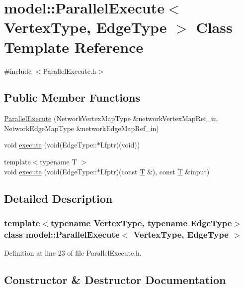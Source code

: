 \hypertarget{classmodel_1_1_parallel_execute}{}\section{model\+:\+:Parallel\+Execute$<$ Vertex\+Type, Edge\+Type $>$ Class Template Reference}
\label{classmodel_1_1_parallel_execute}


{\ttfamily \#include $<$Parallel\+Execute.\+h$>$}

\subsection*{Public Member Functions}
\begin{DoxyCompactItemize}
\item 
\hyperlink{classmodel_1_1_parallel_execute_a59e18e460e727b43d7bd078659be7662}{Parallel\+Execute} (Network\+Vertex\+Map\+Type \&network\+Vertex\+Map\+Ref\+\_\+in, Network\+Edge\+Map\+Type \&network\+Edge\+Map\+Ref\+\_\+in)
\item 
void \hyperlink{classmodel_1_1_parallel_execute_abeb5a58c4db9e037e8de14afe0d99475}{execute} (void(Edge\+Type\+::$\ast$Lfptr)(void))
\item 
{\footnotesize template$<$typename T $>$ }\\void \hyperlink{classmodel_1_1_parallel_execute_a19b90e4dd8cca8bdea9030ba03e07f00}{execute} (void(Edge\+Type\+::$\ast$Lfptr)(const \hyperlink{_spline_node_base__corder1_8h_a82692d3a5502b91460591f1d5504314a}{T} \&), const \hyperlink{_spline_node_base__corder1_8h_a82692d3a5502b91460591f1d5504314a}{T} \&input)
\end{DoxyCompactItemize}


\subsection{Detailed Description}
\subsubsection*{template$<$typename Vertex\+Type, typename Edge\+Type$>$class model\+::\+Parallel\+Execute$<$ Vertex\+Type, Edge\+Type $>$}



Definition at line 23 of file Parallel\+Execute.\+h.



\subsection{Constructor \& Destructor Documentation}
\hypertarget{classmodel_1_1_parallel_execute_a59e18e460e727b43d7bd078659be7662}{}

